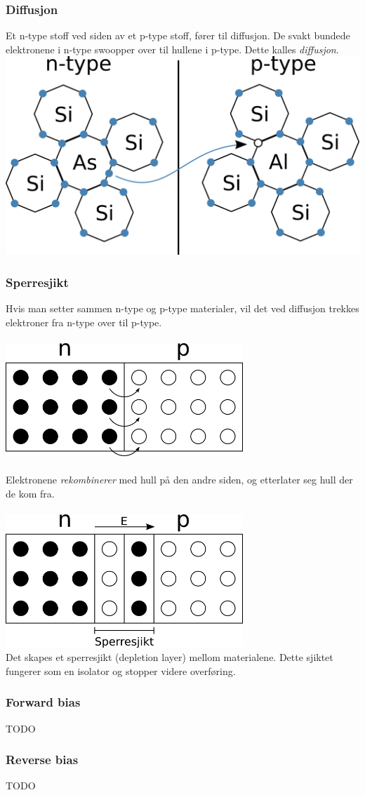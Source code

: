 \subsubsection{Diffusjon}
Et n-type stoff ved siden av et p-type stoff, fører til diffusjon.
De svakt bundede elektronene i n-type swoopper over
til hullene i p-type.
Dette kalles \emph{diffusjon}.
\\
\includegraphics[width=\textwidth]{./img/krystall-pn}

\subsubsection{Sperresjikt}
Hvis man setter sammen n-type og p-type materialer,
vil det ved diffusjon trekkes elektroner
fra n-type over til p-type.
\\\\
\includegraphics[width=0.67\textwidth]{./img/pn-junction}
\\\\
Elektronene \emph{rekombinerer} med hull på den andre siden,
og etterlater seg hull der de kom fra.
\\\\
\includegraphics[width=0.67\textwidth]{./img/pn-sperresjikt}
\\
Det skapes et sperresjikt (depletion layer) mellom materialene.
Dette sjiktet fungerer som en isolator og stopper videre overføring.

\subsubsection{Forward bias}
TODO

\subsubsection{Reverse bias}
TODO

